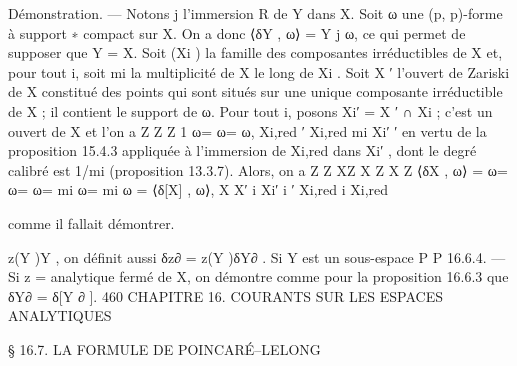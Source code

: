 \documentclass[
  10pt,
]{article}
\newenvironment{Shaded}{}{}
\newcommand{\NormalTok}[1]{#1}
\begin{document}
\begin{Shaded}
\begin{Highlighting}[]
\NormalTok{Démonstration. — Notons j l’immersion   R de     Y dans X. Soit ω une (p, p){-}forme à support}
\NormalTok{                                              ∗}
\NormalTok{compact sur X. On a donc ⟨δY , ω⟩ = Y j ω, ce qui permet de supposer que Y = X.}
\NormalTok{  Soit (Xi ) la famille des composantes irréductibles de X et, pour tout i, soit mi la}
\NormalTok{multiplicité de X le long de Xi . Soit X ′ l’ouvert de Zariski de X constitué des points qui}
\NormalTok{sont situés sur une unique composante irréductible de X ; il contient le support de ω.}
\NormalTok{Pour tout i, posons Xi′ = X ′ ∩ Xi ; c’est un ouvert de X et l’on a}
\NormalTok{                             Z            Z              Z}
\NormalTok{                                                       1}
\NormalTok{                                     ω=            ω=        ω,}
\NormalTok{                              Xi,red          ′}
\NormalTok{                                            Xi,red    mi Xi′}
\NormalTok{                                                              ′}
\NormalTok{en vertu de la proposition 15.4.3 appliquée à l’immersion de Xi,red dans Xi′ , dont le degré}
\NormalTok{calibré est 1/mi (proposition 13.3.7). Alors, on a}
\NormalTok{              Z      Z        XZ          X Z               X Z}
\NormalTok{   ⟨δX , ω⟩ =    ω=      ω=          ω=        mi      ω=       mi        ω = ⟨δ[X] , ω⟩,}
\NormalTok{              X       X′       i   Xi′       i}
\NormalTok{                                                      ′}
\NormalTok{                                                     Xi,red       i   Xi,red}


\NormalTok{comme il fallait démontrer.}

\NormalTok{                     z(Y )Y , on définit aussi δz∂ =   z(Y )δY∂ . Si Y est un sous{-}espace}
\NormalTok{                   P                                 P}
\NormalTok{16.6.4. — Si z =}
\NormalTok{analytique fermé de X, on démontre comme pour la proposition 16.6.3 que δY∂ = δ[Y    ∂}
\NormalTok{                                                                                       ].}
\NormalTok{460              CHAPITRE 16. COURANTS SUR LES ESPACES ANALYTIQUES}

\NormalTok{               § 16.7. LA FORMULE DE POINCARÉ–LELONG}


\end{Highlighting}
\end{Shaded}
\end{document}
